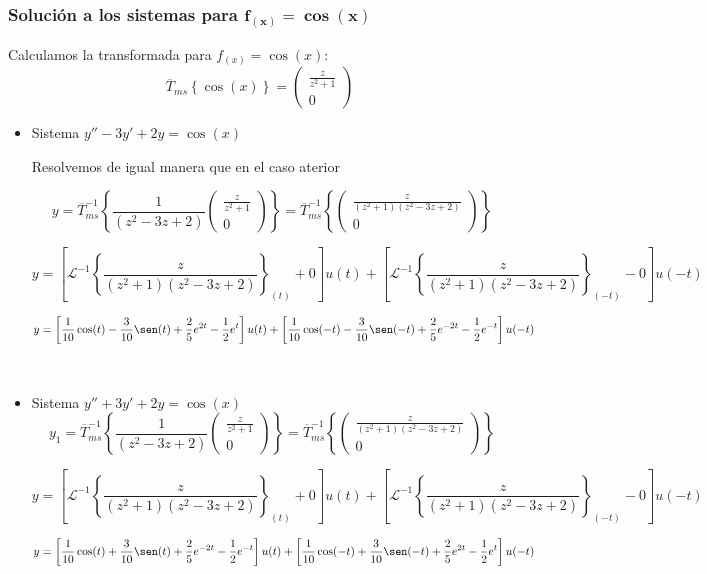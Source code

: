 \documentclass[12pt]{article}
\begin{document}
\subsubsection{Solución a los sistemas para $\bm{ f_{(x)}=\cos(x)}$}

Calculamos la transformada para $f_{(x)} = \cos(x)$:
$$
\overline{T}_{ms}\left\{\cos(x)\right\} = \begin{pmatrix}
\frac{z}{z^2+1}\\[0.3cm]
0
\end{pmatrix}
$$
\begin{itemize}

\item Sistema $y'' - 3 y' +2y=\cos(x)$

Resolvemos de igual manera que en el caso aterior

$$
y=\overline{T}_{ms}^{-1}\left\{ \frac{1}{\left( z^2 - 3z + 2\right) }  \begin{pmatrix}
\frac{z}{z^2+1}\\[0.3cm]
0
\end{pmatrix}\right\} = \overline{T}_{ms}^{-1}\left\{   \begin{pmatrix}
\frac{z}{(z^2+1)( z^2 - 3z + 2)}\\[0.3cm]
0
\end{pmatrix}\right\} 
$$

{\footnotesize
$$
y =\left[ \mathcal{L}^{-1}\left\{\frac{z}{(z^2+1)( z^2 - 3z + 2)}\right\}_{(t)} + 0 \right]  u(t) +  \left[  \mathcal{L}^{-1}\left\{\frac{z}{(z^2+1)( z^2 - 3z + 2)}\right\}_{(-t)} - 0 \right] u(-t)
$$


$$y= \left[\frac{1}{10}\cos(t)-\frac{3}{10}\sen(t)+\frac{2}{5} e^{2t}-\frac{1}{2} e^{t}\right] u(t)+ \left[\frac{1}{10}\cos(-t)-\frac{3}{10}\sen(-t)+\frac{2}{5} e^{-2t}-\frac{1}{2} e^{-t}\right]  u(-t)$$
}\\



\item Sistema $y'' + 3 y' +2y=\cos(x)$
$$
y_1 =\overline{T}_{ms}^{-1}\left\{ \frac{1}{\left( z^2 - 3z + 2\right) }  \begin{pmatrix}
\frac{z}{z^2+1}\\[0.3cm]
0
\end{pmatrix}\right\} = \overline{T}_{ms}^{-1}\left\{   \begin{pmatrix}
\frac{z}{(z^2+1)( z^2 - 3z + 2)}\\[0.3cm]
0
\end{pmatrix}\right\} 
$$

{\footnotesize
$$
y =\left[ \mathcal{L}^{-1}\left\{\frac{z}{(z^2+1)( z^2 - 3z + 2)}\right\}_{(t)} + 0 \right]  u(t) +  \left[  \mathcal{L}^{-1}\left\{\frac{z}{(z^2+1)( z^2 - 3z + 2)}\right\}_{(-t)} - 0 \right] u(-t)
$$


$$y= \left[\frac{1}{10}\cos(t)+\frac{3}{10}\sen(t)+\frac{2}{5} e^{-2t}-\frac{1}{2} e^{-t}\right] u(t)+ \left[\frac{1}{10}\cos(-t)+\frac{3}{10}\sen(-t)+\frac{2}{5} e^{2t}-\frac{1}{2} e^{t}\right]  u(-t)$$
}\\

\end{itemize}
\end{document}
